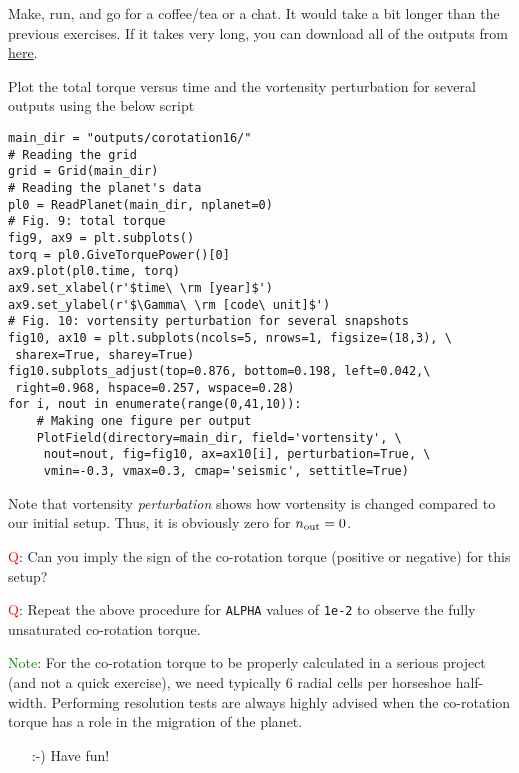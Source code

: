 \documentclass[14pt]{scrartcl}
\begin{document}
Make, run, and go for a coffee/tea or a chat. It would take a bit longer than the previous exercises. If it takes very long, you can download all of the outputs from \href{https://fumdrive.um.ac.ir/index.php/s/ac6t3bdYtZZqjTi}{here}.

Plot the total torque versus time and the vortensity perturbation for several outputs using the below script 

\begin{verbatim}
main_dir = "outputs/corotation16/"
# Reading the grid
grid = Grid(main_dir)
# Reading the planet's data
pl0 = ReadPlanet(main_dir, nplanet=0)
# Fig. 9: total torque
fig9, ax9 = plt.subplots()
torq = pl0.GiveTorquePower()[0]
ax9.plot(pl0.time, torq)
ax9.set_xlabel(r'$time\ \rm [year]$')
ax9.set_ylabel(r'$\Gamma\ \rm [code\ unit]$')
# Fig. 10: vortensity perturbation for several snapshots
fig10, ax10 = plt.subplots(ncols=5, nrows=1, figsize=(18,3), \
 sharex=True, sharey=True)
fig10.subplots_adjust(top=0.876, bottom=0.198, left=0.042,\
 right=0.968, hspace=0.257, wspace=0.28)
for i, nout in enumerate(range(0,41,10)):
    # Making one figure per output
    PlotField(directory=main_dir, field='vortensity', \
     nout=nout, fig=fig10, ax=ax10[i], perturbation=True, \
     vmin=-0.3, vmax=0.3, cmap='seismic', settitle=True)
\end{verbatim}

Note that vortensity \emph{perturbation} shows how vortensity is changed compared to our initial setup. Thus, it is obviously zero for $n_{\rm out}=0$.

\textcolor{red}{Q}: Can you imply the sign of the co-rotation torque (positive or negative) for this setup?

\textcolor{red}{Q}: Repeat the above procedure for \texttt{ALPHA} values of \texttt{1e-2} to observe the fully unsaturated co-rotation torque.

\textcolor{green}{Note}: For the co-rotation torque to be properly calculated in a serious project (and not a quick exercise), we need typically 6 radial cells per horseshoe half-width. Performing resolution tests are always highly advised when the co-rotation torque has a role in the migration of the planet.

\begin{itemize}
\item[:-)] Have fun!
\end{itemize}
\end{document}

